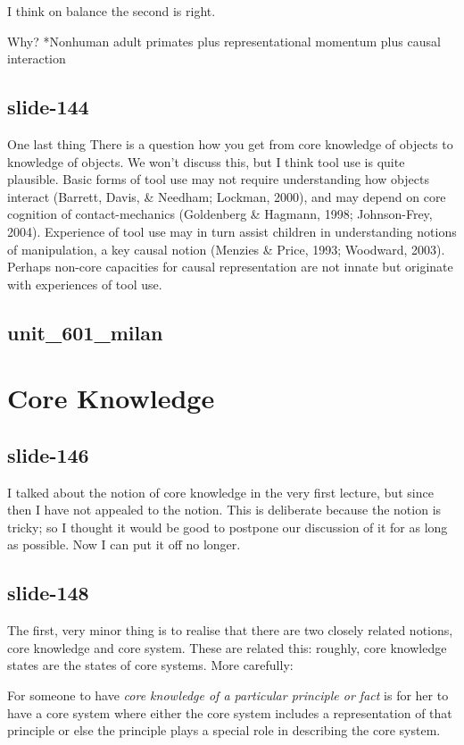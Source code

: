 \documentclass[12pt,\papersize]{extarticle}
\begin{document}
I think on balance the second is right.
 
Why?  *Nonhuman adult primates plus representational momentum plus causal interaction
 
\subsection{slide-144}
One last thing
There is a question how you get from core knowledge of objects to knowledge of objects.
We won't discuss this, but I think tool use is quite plausible.
Basic forms of tool use may not require understanding how objects interact 
(Barrett, Davis, \& Needham; Lockman, 2000), and may depend on core cognition of 
contact-mechanics (Goldenberg \& Hagmann, 1998; Johnson-Frey, 2004). Experience of 
tool use may in turn assist children in understanding notions of manipulation, a 
key causal notion (Menzies \& Price, 1993; Woodward, 2003). Perhaps non-core capacities 
for causal representation are not innate but originate with experiences of tool use.
 
\subsection{unit\_601\_milan}
 
 
\section{Core Knowledge}
 
\subsection{slide-146}
I talked about the notion of core knowledge in the very first lecture, but since then I 
have not appealed to the notion.
This is deliberate because the notion is tricky; so I thought it would be good to postpone
our discussion of it for as long as possible.
Now I can put it off no longer.
 
\subsection{slide-148}
The first, very minor thing is to realise that there are two closely related notions, core 
knowledge and core system.
These are related this: roughly, core knowledge states are the states of core systems.  More 
carefully:
 
For someone to have \textit{core knowledge of a particular principle or fact} is for her to have a core system where 
            either the core system includes a representation of that principle or else the principle plays a special role in describing the core system.
 
\end{document}
